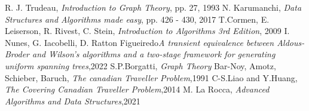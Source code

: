 
\begin{thebibliography}{100}

R. J. Trudeau, \emph{Introduction to Graph Theory}, pp. 27, 1993
N. Karumanchi, \emph{Data Structures and Algorithms made easy}, pp. 426 - 430, 2017
T.Cormen, E. Leiserson, R. Rivest, C. Stein, \emph{Introduction to Algorithms 3rd Edition}, 2009
I. Nunes, G. Iacobelli, D. Ratton Figueiredo\emph{A transient equivalence between Aldous-Broder and Wilson's algorithms and a two-stage framework for generating uniform spanning trees},2022
S.P.Borgatti, \emph{Graph Theory}
Bar-Noy, Amotz, Schieber, Baruch, \emph{The canadian Traveller Problem},1991
C-S.Liao and Y.Huang, \emph{The Covering Canadian Traveller Problem},2014
M. La Rocca, \emph{Advanced Algorithms and Data Structures},2021 
\end{thebibliography}
